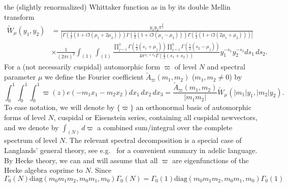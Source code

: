\documentclass[11pt]{amsart}
\theoremstyle{plain}
\numberwithin{equation}{section}
\theoremstyle{definition}
\begin{document}
the (slightly renormalized) Whittaker function as in \cite[(2.15)]{Bl} by its double Mellin transform
\begin{equation}\label{whit}
\begin{split}
  \tilde{W}_{\mu}(y_1, y_2) & = \frac{y_1y_2 \pi^{\frac{3}{2}  } }{     |\Gamma(\frac{1}{2} (1 + i \Im (\mu_1 + 2\mu_2)))\Gamma(\frac{1}{2} (1 + i \Im (\mu_1 - \mu_2)))\Gamma(\frac{1}{2} (1 + i \Im (2\mu_1 + \mu_2)))|}\\
  & \times \frac{1}{(2\pi i)^2} \int_{(1)} \int_{(1)} \frac{\prod_{j=1}^3 \Gamma(\frac{1}{2}(s_1 + \mu_j)) \prod_{j=1}^3 \Gamma(\frac{1}{2}(s_2 - \mu_j)) }{4\pi^{s_1+s_2} \Gamma(\frac{1}{2}(s_1+s_2))} y_1^{-s_1} y_2^{-s_2} ds_1\, ds_2. 
  \end{split}
\end{equation}
For a (not necessarily cuspidal) automorphic form    $\varpi $ of level $N$ and spectral parameter $\mu$ we define the Fourier coefficient $\tilde{A}_{\varpi}(m_1, m_2)$ ($m_1, m_2 \not= 0$) by 
\begin{equation}\label{four}
  \int_0^1\int_0^1 \int_0^1 \varpi(z) e(-m_1x_1-m_2x_2) dx_1 \, dx_2 \, dx_3 = \frac{\tilde{A}_{\varpi}(m_1, m_2)}{|m_1m_2|} \tilde{W}_{\mu}(|m_1|y_1, |m_2|y_2). 
\end{equation}
To ease notation, we will denote by $\{\varpi\}$ an orthonormal basis of automorphic forms of level $N$, cuspidal or Eisenstein series, containing all cuspidal  newvectors, and we denote by $\int_{(N)} d\varpi$ a combined sum/integral over the complete spectrum of level $N$. The relevant spectral decomposition is a special case of Langlands' general theory, see e.g.\ \cite{Ar} for a convenient summary in adelic language. By Hecke theory, we can and will assume that all $\varpi$ are eigenfunctions of the Hecke algebra coprime to $N$. Since 
$$\Gamma_0(N)\text{diag}(m_0m_1m_2, m_0m_1, m_0) \Gamma_0(N) = \Gamma_0(1)\text{diag}(m_0m_1m_2, m_0m_1, m_0) \Gamma_0(1)$$ 
\end{document}
